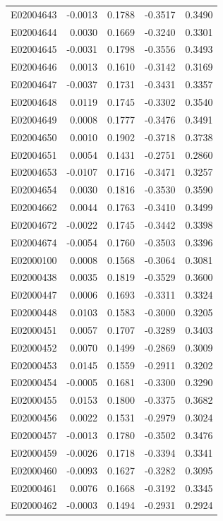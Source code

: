 \documentclass[11pt, a4paper]{article}
\begin{document}
\begin{longtable}{lrrrr}
E02004643 & -0.0013 & 0.1788 & -0.3517 & 0.3490 \\
E02004644 & 0.0030 & 0.1669 & -0.3240 & 0.3301 \\
E02004645 & -0.0031 & 0.1798 & -0.3556 & 0.3493 \\
E02004646 & 0.0013 & 0.1610 & -0.3142 & 0.3169 \\
E02004647 & -0.0037 & 0.1731 & -0.3431 & 0.3357 \\
E02004648 & 0.0119 & 0.1745 & -0.3302 & 0.3540 \\
E02004649 & 0.0008 & 0.1777 & -0.3476 & 0.3491 \\
E02004650 & 0.0010 & 0.1902 & -0.3718 & 0.3738 \\
E02004651 & 0.0054 & 0.1431 & -0.2751 & 0.2860 \\
E02004653 & -0.0107 & 0.1716 & -0.3471 & 0.3257 \\
E02004654 & 0.0030 & 0.1816 & -0.3530 & 0.3590 \\
E02004662 & 0.0044 & 0.1763 & -0.3410 & 0.3499 \\
E02004672 & -0.0022 & 0.1745 & -0.3442 & 0.3398 \\
E02004674 & -0.0054 & 0.1760 & -0.3503 & 0.3396 \\
E02000100 & 0.0008 & 0.1568 & -0.3064 & 0.3081 \\
E02000438 & 0.0035 & 0.1819 & -0.3529 & 0.3600 \\
E02000447 & 0.0006 & 0.1693 & -0.3311 & 0.3324 \\
E02000448 & 0.0103 & 0.1583 & -0.3000 & 0.3205 \\
E02000451 & 0.0057 & 0.1707 & -0.3289 & 0.3403 \\
E02000452 & 0.0070 & 0.1499 & -0.2869 & 0.3009 \\
E02000453 & 0.0145 & 0.1559 & -0.2911 & 0.3202 \\
E02000454 & -0.0005 & 0.1681 & -0.3300 & 0.3290 \\
E02000455 & 0.0153 & 0.1800 & -0.3375 & 0.3682 \\
E02000456 & 0.0022 & 0.1531 & -0.2979 & 0.3024 \\
E02000457 & -0.0013 & 0.1780 & -0.3502 & 0.3476 \\
E02000459 & -0.0026 & 0.1718 & -0.3394 & 0.3341 \\
E02000460 & -0.0093 & 0.1627 & -0.3282 & 0.3095 \\
E02000461 & 0.0076 & 0.1668 & -0.3192 & 0.3345 \\
E02000462 & -0.0003 & 0.1494 & -0.2931 & 0.2924 \\

\end{longtable}
\end{document}
